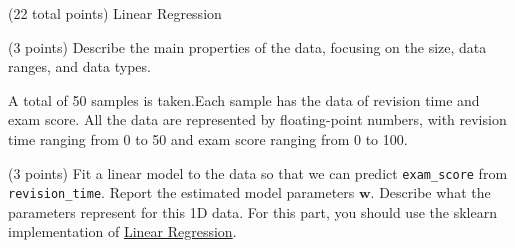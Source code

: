 \documentclass[12pt]{article}
\begin{document}
\maketitle
\thispagestyle{empty}







\clearpage

\begin{question}{(22 total points) Linear Regression}




%
%
\begin{subquestion}{(3 points) Describe the main properties of the data, focusing on the size, data ranges, and data types.   
}


\begin{answerbox}{10em}

A total of 50 samples is taken.Each sample has the data of revision time and exam score.
All the data are represented by floating-point numbers, with revision time ranging from 0 to 50 and
exam score ranging from 0 to 100.

\end{answerbox}



\end{subquestion}




%
%
\begin{subquestion}{(3 points) Fit a linear model to the data so that we can predict \texttt{exam\_score} from \texttt{revision\_time}. 
Report the estimated model parameters $\mathbf{w}$. 
Describe what the parameters represent for this 1D data. 
For this part, you should use the sklearn implementation of \href{https://scikit-learn.org/0.19/modules/generated/sklearn.linear_model.LinearRegression.html}{Linear Regression}.\\
}


\begin{answerbox}{10em}


\end{answerbox}
\end{subquestion}
\end{question}
\end{document}
